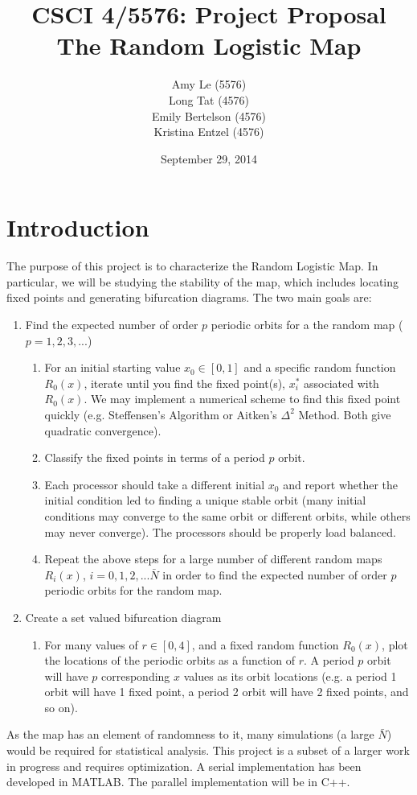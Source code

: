 \documentclass[12pt]{article}
\newcommand{\be}{\begin{enumerate}}
\newcommand{\ee}{\end{enumerate}}
\begin{document}
\pagestyle{plain} %
\title{CSCI 4/5576: Project Proposal \\ The Random Logistic Map}
\date{September 29, 2014}
\author{Amy Le (5576)\\Long Tat (4576)\\Emily Bertelson (4576)\\Kristina Entzel (4576)}
\maketitle

\section{Introduction}
The purpose of this project is to characterize the Random Logistic
Map. In particular, we will be studying the stability of the map,
which includes locating fixed points and generating bifurcation
diagrams. The two main goals are:
\be
\item Find the expected number of order $p$ periodic orbits for a
  the random map ($p = 1, 2, 3, ...$)
\be
\item For an initial starting value $x_0 \in [0,1]$ and a specific
  random function $R_0(x)$, iterate until you
  find the fixed point(s), $x_i^*$ associated with $R_0(x)$. We may implement a numerical
  scheme to find this fixed point quickly (e.g. Steffensen's Algorithm or
  Aitken's $\Delta^2$ Method. Both give quadratic convergence).
\item Classify the fixed points in terms of a period $p$ orbit. 
\item Each processor should take a different initial $x_0$ and report
  whether the initial condition led to finding a unique stable orbit
  (many initial conditions may converge to the same orbit or different
  orbits, while others may never converge). The processors should be
  properly load balanced.
\item Repeat the above steps for a large number of different random
  maps $R_i(x)$, $i = 0, 1, 2,... \bar{N}$ in order to find the expected
  number of order $p$ periodic orbits for the random map.
\ee
\item Create a set valued bifurcation diagram \cite{lamb}
\be
\item For many values of $r \in [0,4]$, and a fixed random function
  $R_0(x)$, plot the locations of the periodic orbits as a function of
  $r$. A period $p$ orbit will have $p$ corresponding $x$ values as
  its orbit locations (e.g. a period 1 orbit will have 1 fixed point,
  a period 2 orbit will have 2 fixed points, and so on). 
\ee
\ee
As the map has an element of randomness to it, many
simulations (a large $\bar{N}$) would be required for statistical analysis. This project is a subset of a larger work in progress
and requires optimization. A serial implementation has been developed
in MATLAB. The parallel implementation will be in C++.
\end{document}
